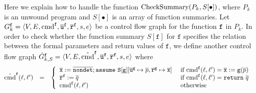 Here we explain how to handle the function $\textmd{CheckSummary} (P_k, S[\bullet])$, where $P_k$ is an unwound program and $S[\bullet]$ is an
array of function summaries.
Let $G^{\mathtt{{f}}}_k = \langle V, E, \textmd{cmd}^{\mathtt{{f}}}, \overline{\mathtt{u}}^{\mathtt{{f}}}, \overline{\mathtt{r}}^{\mathtt{{f}}},s,e \rangle$ be a
control flow graph for the function $\mathtt{{f}}$ in $P_k$. In order to check whether the function
summary $S[{\mathtt{f}}]$ for $\mathtt{f}$ specifies the relation 
between the formal parameters and return values of $\mathtt{f}$, 
we define another control flow graph
$\hat{G}^{\mathtt{{f}}}_{k,S} = \langle V, E, \hat{\textmd{cmd}}^{\mathtt{{f}}}, \overline{\mathtt{u}}^{\mathtt{{f}}}, \overline{\mathtt{r}}^{\mathtt{{f}}},s,e \rangle$ where
\begin{equation*}
\hspace{-0.2cm}
  \begin{array}{rcl}
    \hat{\textmd{cmd}}^\fun{f} (\ell, \ell') & = &
    \left\{
      \begin{array}{ll}
        \overline{\mathtt{x}} := 
        \overline{\mathtt{nondet}};
        \mathtt{assume\ S[{\mathtt{g}}]}[
        \mathtt{\overline{u}^g} \mapsto \overline{p},
        \mathtt{\overline{r}^g} \mapsto \overline{\mathtt{x}}]    
        &
        \textmd{ if } \textmd{cmd}^\fun{f} (\ell, \ell') = 
        \overline{\mathtt{x}} := \mathtt{g} (\overline{p})\\
		\mathtt{\overline{r}}^\fun{f} := \overline{q}
        &
        \textmd{ if } \textmd{cmd}^\fun{f} (\ell, \ell') = \mathtt{return\ }
        \overline{q}\\
        \textmd{cmd}^\fun{f} (\ell, \ell')
        &
		\textmd{ otherwise}        
      \end{array}
    \right.
  \end{array}
\end{equation*}

